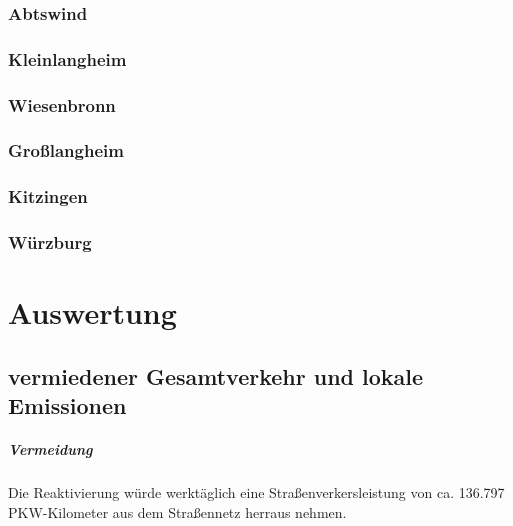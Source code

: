 \documentclass[fontsize=12pt,a4paper]{scrreprt}
\begin{document}
                \subsection{Abtswind}
                
                
                \subsection{Kleinlangheim}
                
                
                \subsection{Wiesenbronn}
                
                
                \subsection{Großlangheim}
                
                
                \subsection{Kitzingen}
                
                
                \subsection{Würzburg}
                

    \chapter{Auswertung}
        \section{vermiedener Gesamtverkehr und lokale Emissionen}


                \paragraph{Vermeidung}
Die Reaktivierung würde werktäglich eine Straßenverkersleistung von ca. 136.797 PKW-Kilometer aus dem Straßennetz herraus nehmen.
\end{document}

